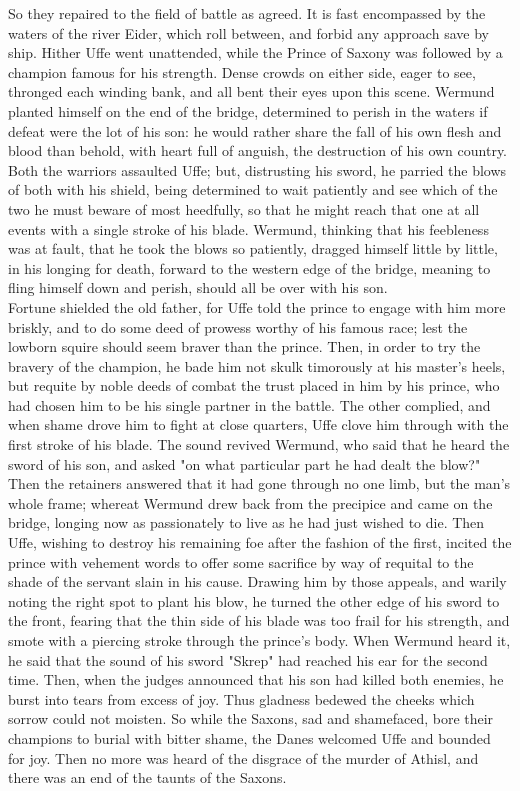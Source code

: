 \documentclass[10pt,a4paper]{report}
\begin{document}
So they repaired to the field of battle as agreed. It is fast encompassed by the waters of the river Eider, which roll between, and forbid any approach save by ship. Hither Uffe went unattended, while the Prince of Saxony was followed by a champion famous for his strength. Dense crowds on either side, eager to see, thronged each winding bank, and all bent their eyes upon this scene. Wermund planted himself on the end of the bridge, determined to perish in the waters if defeat were the lot of his son: he would rather share the fall of his own flesh and blood than behold, with heart full of anguish, the destruction of his own country. Both the warriors assaulted Uffe; but, distrusting his sword, he parried the blows of both with his shield, being determined to wait patiently and see which of the two he must beware of most heedfully, so that he might reach that one at all events with a single stroke of his blade. Wermund, thinking that his feebleness was at fault, that he took the blows so patiently, dragged himself little by little, in his longing for death, forward to the western edge of the bridge, meaning to fling himself down and perish, should all be over with his son.\\

Fortune shielded the old father, for Uffe told the prince to engage with him more briskly, and to do some deed of prowess worthy of his famous race; lest the lowborn squire should seem braver than the prince. Then, in order to try the bravery of the champion, he bade him not skulk timorously at his master's heels, but requite by noble deeds of combat the trust placed in him by his prince, who had chosen him to be his single partner in the battle. The other complied, and when shame drove him to fight at close quarters, Uffe clove him through with the first stroke of his blade. The sound revived Wermund, who said that he heard the sword of his son, and asked "on what particular part he had dealt the blow?" Then the retainers answered that it had gone through no one limb, but the man's whole frame; whereat Wermund drew back from the precipice and came on the bridge, longing now as passionately to live as he had just wished to die. Then Uffe, wishing to destroy his remaining foe after the fashion of the first, incited the prince with vehement words to offer some sacrifice by way of requital to the shade of the servant slain in his cause. Drawing him by those appeals, and warily noting the right spot to plant his blow, he turned the other edge of his sword to the front, fearing that the thin side of his blade was too frail for his strength, and smote with a piercing stroke through the prince's body. When Wermund heard it, he said that the sound of his sword "Skrep" had reached his ear for the second time. Then, when the judges announced that his son had killed both enemies, he burst into tears from excess of joy. Thus gladness bedewed the cheeks which sorrow could not moisten. So while the Saxons, sad and shamefaced, bore their champions to burial with bitter shame, the Danes welcomed Uffe and bounded for joy. Then no more was heard of the disgrace of the murder of Athisl, and there was an end of the taunts of the Saxons.\\
\end{document}
